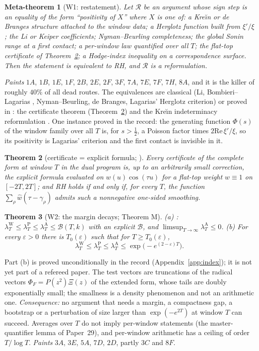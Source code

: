 \documentclass[11pt]{amsart}
\newtheorem{theorem}{Theorem}[section]
\newtheorem{metatheorem}[theorem]{Meta-theorem}
\theoremstyle{definition}
\theoremstyle{remark}
\newcommand{\Rel}{\mathrm{Re}\,}
\newcommand{\lamA}{\lambda^{\mathrm A}_T}
\newcommand{\lamW}{\lambda^{\mathrm W}_T}
\begin{document}
\begin{metatheorem}[W1: restatement]\label{W1}
Let $\mathcal R$ be an argument whose sign step is an equality of the form ``positivity of $X$'' where $X$
is one of: a Kre\u{\i}n or de Branges structure attached to the window data; a Herglotz function built
from $\xi'/\xi$; the Li or Keiper coefficients; Nyman--Beurling completeness; the global Sonin range at a
first contact; a per-window law quantified over all $T$; the flat-top certificate of
Theorem~\ref{thm:Z}; a Hodge-index inequality on a correspondence surface. Then the statement is
equivalent to RH, and $\mathcal R$ is a reformulation.
\end{metatheorem}
\noindent\emph{Paints} $1A$, $1B$, $1E$, $1F$, $2B$, $2E$, $2F$, $3F$, $7A$, $7E$, $7F$, $7H$, $8A$, and it is the
killer of roughly $40\%$ of all dead routes. The equivalences are classical (Li, Bombieri--Lagarias
\cite{BombieriLagarias1999}, Nyman--Beurling, de Branges, Lagarias' Herglotz criterion) or proved in
\cite{Paper47}: the certificate theorem (Theorem~\ref{thm:Z}) and the Kre\u{\i}n indeterminacy
reformulation \cite[Thm.~8.5]{Paper47}. One instance proved in the record: the generating
function $\Phi(s)$ of the window family over all $T$ is, for $s>\frac12$, a Poisson factor times
$2\Rel\xi'/\xi$, so its positivity is Lagarias' criterion and the first contact is invisible in it.

\begin{theorem}[certificate = explicit formula; ]\label{thm:Z}
Every certificate of the complete form at window $T$ in the dual program is, up to an arbitrarily small
correction, the explicit formula evaluated on $w(u)\cos(\tau u)$ for a flat-top weight $w\equiv1$ on
$[-2T,2T]$; and RH holds if and only if, for every $T$, the function $\sum_\rho\widehat w(\tau-\gamma_\rho)$
admits such a nonnegative one-sided smoothing.
\end{theorem}

\begin{theorem}[W2: the margin decays; Theorem M]\label{thm:M}
(a) \cite[Thm.~11.5]{Paper47}: $\lamW\le\lambda^{\mathrm P}_T\le\lamA\le\mathcal B(T,k)$ with an
explicit $\mathcal B$, and $\limsup_{T\to\infty}\lamA\le0$.
(b) For every $\varepsilon>0$ there is $T_0(\varepsilon)$ such that for $T\ge T_0(\varepsilon)$,
\[
\lamW\le\lambda^{\mathrm P}_T\le\lamA\le\exp\!\big(-e^{(2-\varepsilon)T}\big).
\]
\end{theorem}
\noindent Part (b) is proved unconditionally in the record (Appendix~\ref{app:index}); it is not yet part of a
refereed paper. The test vectors are truncations of the radical vectors $\Phi_F=P(z^2)\Xi(z)$ of the
extended form, whose tails are doubly exponentially small; the smallness is a density phenomenon and not
an arithmetic one. \emph{Consequence:} no argument that needs a margin, a compactness gap, a bootstrap or
a perturbation of size larger than $\exp(-e^{2T})$ at window $T$ can succeed. Averages over $T$ do not
imply per-window statements (the master-quantifier lemma of Paper~29), and per-window arithmetic has a
ceiling of order $T/\log T$.
\emph{Paints} $3A$, $3E$, $5A$, $7D$, $2D$, partly $3C$ and $8F$.
\end{document}
